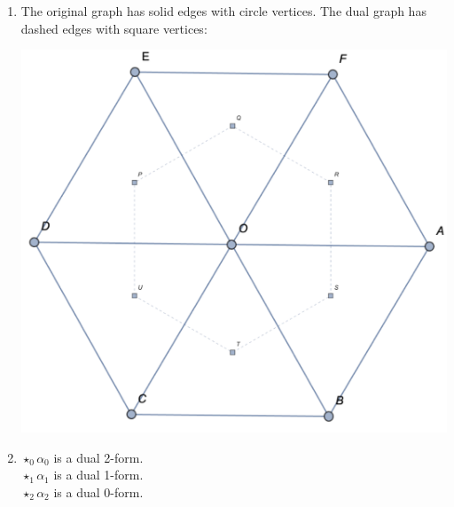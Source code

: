 \documentclass{article}
\begin{document}
\begin{enumerate}[label=(\alph*)]
    \item The original graph has solid edges with circle vertices. The dual graph has dashed edges with square vertices:
    \begin{center}
        \includegraphics[scale=0.5]{figs/dual_graph.pdf}
    \end{center}

    \item
    $\star_0\alpha_0$ is a dual 2-form.\\
    $\star_1\alpha_1$ is a dual 1-form.\\
    $\star_2\alpha_2$ is a dual 0-form.\\


\end{enumerate}
\end{document}
